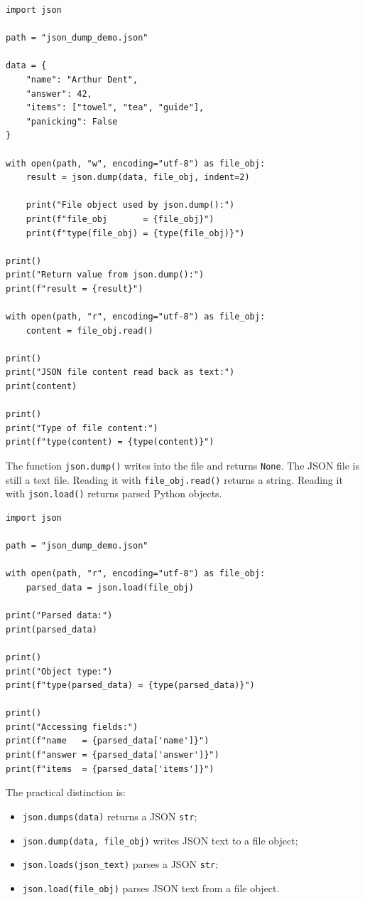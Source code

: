 \begin{verbatim}
import json

path = "json_dump_demo.json"

data = {
    "name": "Arthur Dent",
    "answer": 42,
    "items": ["towel", "tea", "guide"],
    "panicking": False
}

with open(path, "w", encoding="utf-8") as file_obj:
    result = json.dump(data, file_obj, indent=2)

    print("File object used by json.dump():")
    print(f"file_obj       = {file_obj}")
    print(f"type(file_obj) = {type(file_obj)}")

print()
print("Return value from json.dump():")
print(f"result = {result}")

with open(path, "r", encoding="utf-8") as file_obj:
    content = file_obj.read()

print()
print("JSON file content read back as text:")
print(content)

print()
print("Type of file content:")
print(f"type(content) = {type(content)}")
\end{verbatim}

The function \texttt{json.dump()} writes into the file and returns \texttt{None}. The JSON file is still a text file. Reading it with \texttt{file\_obj.read()} returns a string. Reading it with \texttt{json.load()} returns parsed Python objects.

\begin{verbatim}
import json

path = "json_dump_demo.json"

with open(path, "r", encoding="utf-8") as file_obj:
    parsed_data = json.load(file_obj)

print("Parsed data:")
print(parsed_data)

print()
print("Object type:")
print(f"type(parsed_data) = {type(parsed_data)}")

print()
print("Accessing fields:")
print(f"name   = {parsed_data['name']}")
print(f"answer = {parsed_data['answer']}")
print(f"items  = {parsed_data['items']}")
\end{verbatim}

The practical distinction is:

\begin{itemize}
    \item \texttt{json.dumps(data)} returns a JSON \texttt{str};
    \item \texttt{json.dump(data, file\_obj)} writes JSON text to a file object;
    \item \texttt{json.loads(json\_text)} parses a JSON \texttt{str};
    \item \texttt{json.load(file\_obj)} parses JSON text from a file object.
\end{itemize}

